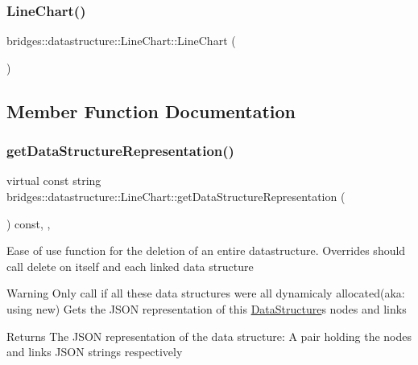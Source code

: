 \subsubsection{\texorpdfstring{Line\+Chart()}{LineChart()}}
{\footnotesize\ttfamily bridges\+::datastructure\+::\+Line\+Chart\+::\+Line\+Chart (\begin{DoxyParamCaption}{ }\end{DoxyParamCaption})\hspace{0.3cm}{\ttfamily [inline]}}



\subsection{Member Function Documentation}
\mbox{\label{classbridges_1_1datastructure_1_1_line_chart_a1e032b058e13ea08a449516698f438ac}} 
\subsubsection{\texorpdfstring{get\+Data\+Structure\+Representation()}{getDataStructureRepresentation()}}
{\footnotesize\ttfamily virtual const string bridges\+::datastructure\+::\+Line\+Chart\+::get\+Data\+Structure\+Representation (\begin{DoxyParamCaption}{ }\end{DoxyParamCaption}) const\hspace{0.3cm}{\ttfamily [inline]}, {\ttfamily [override]}, {\ttfamily [virtual]}}

Ease of use function for the deletion of an entire datastructure. Overrides should call delete on itself and each linked data structure

\begin{DoxyWarning}{Warning}
Only call if all these data structures were all dynamicaly allocated(aka\+: using new) Gets the J\+S\+ON representation of this \hyperlink{classbridges_1_1datastructure_1_1_data_structure}{Data\+Structure}\textquotesingle{}s nodes and links
\end{DoxyWarning}
\begin{DoxyReturn}{Returns}
The J\+S\+ON representation of the data structure\+: A pair holding the nodes and links J\+S\+ON strings respectively 
\end{DoxyReturn}


